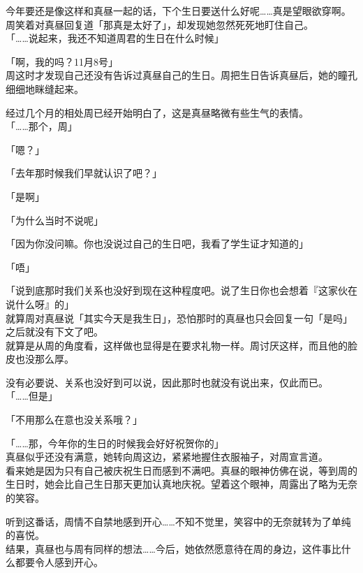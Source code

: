 今年要还是像这样和真昼一起的话，下个生日要送什么好呢……真是望眼欲穿啊。\\

周笑着对真昼回复道「那真是太好了」，却发现她忽然死死地盯住自己。\\

「……说起来，我还不知道周君的生日在什么时候」

「啊，我的吗？11月8号」\\

周这时才发现自己还没有告诉过真昼自己的生日。周把生日告诉真昼后，她的瞳孔细细地眯缝起来。

经过几个月的相处周已经开始明白了，这是真昼略微有些生气的表情。\\

「……那个，周」

「嗯？」

「去年那时候我们早就认识了吧？」

「是啊」

「为什么当时不说呢」

「因为你没问嘛。你也没说过自己的生日吧，我看了学生证才知道的」

「唔」

「说到底那时我们关系也没好到现在这种程度吧。说了生日你也会想着『这家伙在说什么呀』的」\\

就算周对真昼说「其实今天是我生日」，恐怕那时的真昼也只会回复一句「是吗」之后就没有下文了吧。\\

就算是从周的角度看，这样做也显得是在要求礼物一样。周讨厌这样，而且他的脸皮也没那么厚。

没有必要说、关系也没好到可以说，因此那时也就没有说出来，仅此而已。\\

「……但是」

「不用那么在意也没关系哦？」

「……那，今年你的生日的时候我会好好祝贺你的」\\

真昼似乎还没有满意，她转向周这边，紧紧地握住衣服袖子，对周宣言道。\\

看来她是因为只有自己被庆祝生日而感到不满吧。真昼的眼神仿佛在说，等到周的生日时，她会比自己生日那天更加认真地庆祝。望着这个眼神，周露出了略为无奈的笑容。

听到这番话，周情不自禁地感到开心……不知不觉里，笑容中的无奈就转为了单纯的喜悦。\\

结果，真昼也与周有同样的想法……今后，她依然愿意待在周的身边，这件事比什么都要令人感到开心。\\

